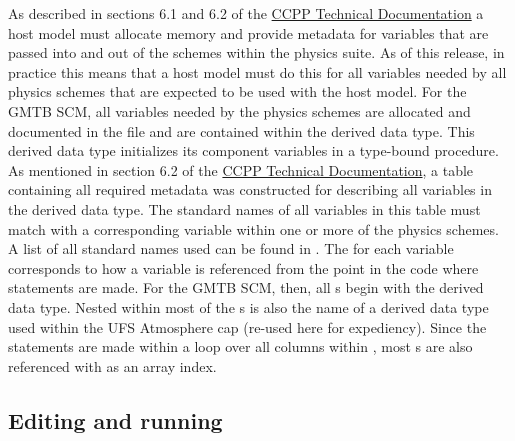 As described in sections 6.1 and 6.2 of the \href{https://dtcenter.org/GMTB/v3.0/ccpp\_tech\_guide}{CCPP Technical Documentation} a host model must allocate memory and provide metadata for variables that are passed into and out of the schemes within the physics suite. As of this release, in practice this means that a host model must do this for all variables needed by all physics schemes that are expected to be used with the host model. For the GMTB SCM, all variables needed by the physics schemes are allocated and documented in the file  and are contained within the  derived data type. This derived data type initializes its component variables in a  type-bound procedure. As mentioned in section 6.2 of the \href{https://dtcenter.org/GMTB/v3.0/ccpp\_tech\_guide}{CCPP Technical Documentation}, a table containing all required metadata was constructed for describing all variables in the  derived data type. The standard names of all variables in this table must match with a corresponding variable within one or more of the physics schemes. A list of all standard names used can be found in . The  for each variable corresponds to how a variable is referenced from the point in the code where  statements are made. For the GMTB SCM, then, all s begin with the  derived data type. Nested within most of the s is also the name of a derived data type used within the UFS Atmosphere cap (re-used here for expediency). Since the  statements are made within a loop over all columns within , most s are also referenced with  as an array index.

\subsection{Editing and running }

